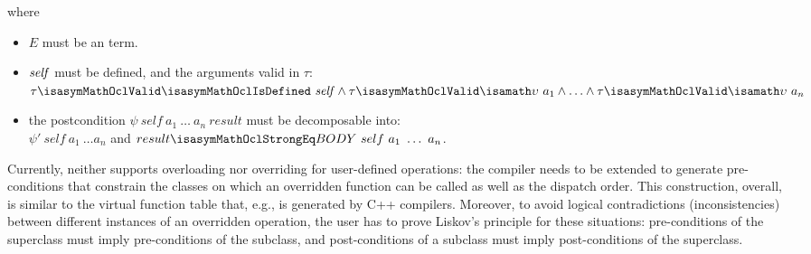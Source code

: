 where
\begin{itemize}
\item $E$ must be an \OCL term.
\item $\mathit{self}$ must be defined, and the arguments valid in $\tau$: \\
      $\tau \isasymMathOclValid \isasymMathOclIsDefined~\self \land \tau \isasymMathOclValid \isasymupsilon~a_1 \land \ldots \land  \tau \isasymMathOclValid \isasymupsilon~ a_n$
\item the postcondition $\psi~self~a_1~\ldots~a_n~result$ must be decomposable
      into: \\
      $\psi'~self~a_1~\ldots a_n$ and $result \isasymMathOclStrongEq BODY~self~a_1~\ldots~a_n$.
\end{itemize}
Currently, \FOCL neither supports overloading nor overriding for
user-defined operations: the \FOCL compiler needs to be extended to
generate pre-conditions that constrain the classes on which an
overridden function can be called as well as the dispatch order. This
construction, overall, is similar to the virtual function table that,
e.g., is generated by C++ compilers. Moreover, to avoid logical
contradictions (inconsistencies) between different instances of an
overridden operation, the user has to prove Liskov's principle for
these situations: pre-conditions of the superclass must imply
pre-conditions of the subclass, and post-conditions of a subclass must
imply post-conditions of the superclass.


